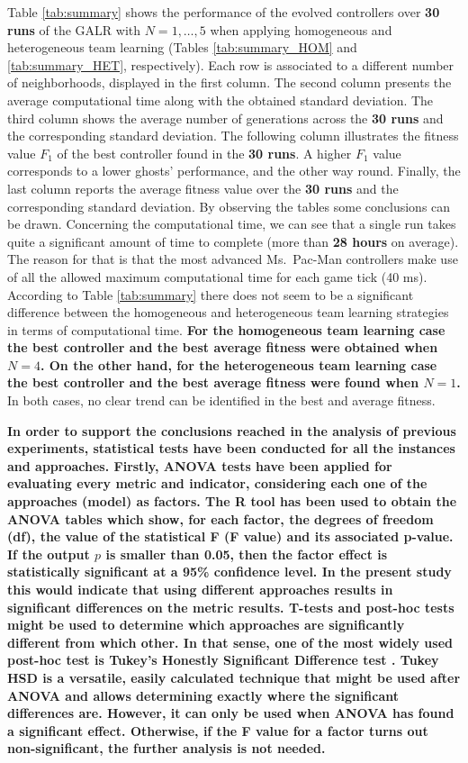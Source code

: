 \documentclass[journal]{IEEEtran}
\begin{document}
Table \ref{tab:summary} shows the performance of the evolved controllers over \textbf{30 runs }of the GALR with $N=1,\ldots,5$ when applying homogeneous and heterogeneous team learning (Tables \ref{tab:summary_HOM} and \ref{tab:summary_HET}, respectively). Each row is associated to a different number of neighborhoods, displayed in the first column. The second column presents the average computational time along with the obtained standard deviation. The third column shows the average number of generations across the \textbf{30 runs }and the corresponding standard deviation. The following column illustrates the fitness value $F_1$ of the best controller found in the \textbf{30 runs}. A higher $F_1$ value corresponds to a lower ghosts' performance, and the other way round. Finally, the last column reports the average fitness value over the \textbf{30 runs }and the corresponding standard deviation. By observing the tables some conclusions can be drawn.
Concerning the computational time, we can see that a single run takes
quite a significant amount of time to complete (more than \textbf{28 hours}
on average). The reason for that is that the most advanced
Ms.\  Pac-Man controllers make use of all the allowed maximum
computational time for each game tick (40 ms). According to Table \ref{tab:summary} there does not seem to be a significant difference between the homogeneous and heterogeneous team learning strategies in terms of computational time.
\textbf{For the homogeneous team learning case the best controller and the best average fitness were obtained when $N=4$. On the other hand, for the heterogeneous team learning case the best controller and the best average fitness were found when $N=1$. }In both cases, no clear trend can be identified in the best and average fitness. 

\textbf{In order to support the conclusions reached in the analysis of previous experiments, statistical tests have been conducted for all the instances and approaches.  Firstly, ANOVA tests \cite{Fisher25,Fisher36} have been applied for evaluating every metric and indicator, considering each one of the approaches (model) as factors. The R tool has been used to obtain the ANOVA tables which show, for each factor, the degrees of freedom (df), the value of the statistical F (F value) and its associated p-value. If the output $p$ is smaller than 0.05, then the factor effect is statistically significant at a 95\% confidence level. In the present study this would indicate that using different approaches results in significant differences on the metric results. T-tests and post-hoc tests might be used to determine which approaches are significantly different from which other.  In that sense, one of the most widely used post-hoc test is Tukey’s Honestly Significant Difference test \cite{Dickinson1971}. Tukey HSD is a versatile, easily calculated technique that might be used after ANOVA and allows determining exactly where the significant differences are. However, it can only be used when ANOVA has found a significant effect. Otherwise, if the F value for a factor turns out non-significant, the further analysis is not needed.}
\end{document}
